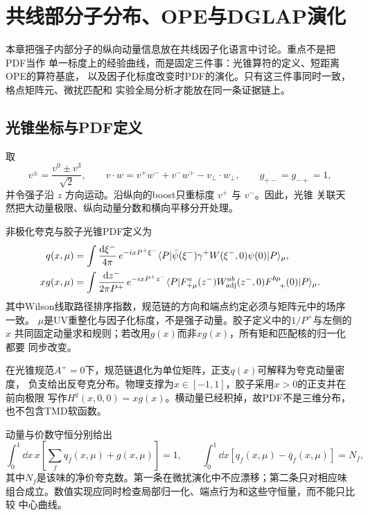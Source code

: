 \chapter{共线部分子分布、OPE与DGLAP演化}

本章把强子内部分子的纵向动量信息放在共线因子化语言中讨论。重点不是把PDF当作
单一标度上的经验曲线，而是固定三件事：光锥算符的定义、短距离OPE的算符基底，
以及因子化标度改变时PDF的演化。只有这三件事同时一致，格点矩阵元、微扰匹配和
实验全局分析才能放在同一条证据链上。

\section{光锥坐标与PDF定义}

取
\begin{equation}
  v^\pm=\frac{v^0\pm v^3}{\sqrt2},\qquad
  v\cdot w=v^+w^-+v^-w^+-v_\perp\cdot w_\perp,
  \qquad g_{+-}=g_{-+}=1,
  \label{eq:b04-lightcone-metric}
\end{equation}
并令强子沿 $z$ 方向运动。沿纵向的boost只重标度 $v^+$ 与 $v^-$。因此，光锥
关联天然把大动量极限、纵向动量分数和横向平移分开处理。

非极化夸克与胶子光锥PDF定义为
\begin{align}
  q(x,\mu)&=\int\frac{\mathrm{d}\xi^-}{4\pi}\,
  e^{-ixP^+\xi^-}
  \langle P|\bar\psi(\xi^-)\gamma^+
  W(\xi^-,0)\psi(0)|P\rangle_\mu,
  \label{eq:b04-lc-quark}
  \\
  xg(x,\mu)&=\int\frac{\mathrm{d} z^-}{2\pi P^+}\,
  e^{-ixP^+z^-}
  \langle P|F^{a}_{+\mu}(z^-)W_{\rm adj}^{ab}(z^-,0)
  F^{b\mu}_{\phantom{b\mu}+}(0)|P\rangle_\mu .
  \label{eq:b04-lc-gluon}
\end{align}
其中Wilson线取路径排序指数，规范链的方向和端点约定必须与矩阵元中的场序一致。
$\mu$是UV重整化与因子化标度，不是强子动量。胶子定义中的$1/P^+$与左侧的$x$
共同固定动量求和规则；若改用$g(x)$而非$xg(x)$，所有矩和匹配核的归一化都要
同步改变。

在光锥规范$A^+=0$下，规范链退化为单位矩阵，正支$q(x)$可解释为夸克动量密度，
负支给出反夸克分布。物理支撑为$x\in[-1,1]$，胶子采用$x>0$的正支并在前向极限
写作$H^g(x,0,0)=xg(x)$。横动量已经积掉，故PDF不是三维分布，也不包含TMD软函数。

动量与价数守恒分别给出
\begin{equation}
  \int_0^1\dd x\,x\left[\sum_f q_f(x,\mu)+g(x,\mu)\right]=1,
  \qquad
  \int_0^1\dd x\left[q_f(x,\mu)-\bar q_f(x,\mu)\right]=N_f,
  \label{eq:b04-pdf-sumrules}
\end{equation}
其中$N_f$是该味的净价夸克数。第一条在微扰演化中不应漂移；第二条只对相应味
组合成立。数值实现应同时检查局部归一化、端点行为和这些守恒量，而不能只比较
中心曲线。

